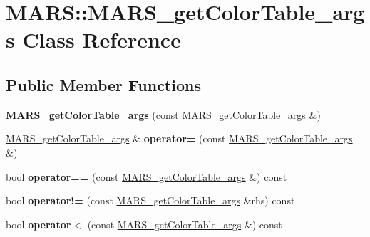 \hypertarget{classMARS_1_1MARS__getColorTable__args}{}\section{M\+A\+RS\+:\+:M\+A\+R\+S\+\_\+get\+Color\+Table\+\_\+args Class Reference}
\label{classMARS_1_1MARS__getColorTable__args}
\subsection*{Public Member Functions}
\begin{DoxyCompactItemize}
\item 
\mbox{\label{classMARS_1_1MARS__getColorTable__args_a8281babd6a3c80608b489c69badb4474}} 
{\bfseries M\+A\+R\+S\+\_\+get\+Color\+Table\+\_\+args} (const \hyperlink{classMARS_1_1MARS__getColorTable__args}{M\+A\+R\+S\+\_\+get\+Color\+Table\+\_\+args} \&)
\item 
\mbox{\label{classMARS_1_1MARS__getColorTable__args_a741536fc92f8da49ac383cdb98035117}} 
\hyperlink{classMARS_1_1MARS__getColorTable__args}{M\+A\+R\+S\+\_\+get\+Color\+Table\+\_\+args} \& {\bfseries operator=} (const \hyperlink{classMARS_1_1MARS__getColorTable__args}{M\+A\+R\+S\+\_\+get\+Color\+Table\+\_\+args} \&)
\item 
\mbox{\label{classMARS_1_1MARS__getColorTable__args_a1a6ebf22a52b65ee6e5e6261795b2153}} 
bool {\bfseries operator==} (const \hyperlink{classMARS_1_1MARS__getColorTable__args}{M\+A\+R\+S\+\_\+get\+Color\+Table\+\_\+args} \&) const
\item 
\mbox{\label{classMARS_1_1MARS__getColorTable__args_a4a0f545f35ea6bca03c384f2692b11d2}} 
bool {\bfseries operator!=} (const \hyperlink{classMARS_1_1MARS__getColorTable__args}{M\+A\+R\+S\+\_\+get\+Color\+Table\+\_\+args} \&rhs) const
\item 
\mbox{\label{classMARS_1_1MARS__getColorTable__args_ada928ce883b979eb7bca7a50bff59eaa}} 
bool {\bfseries operator$<$} (const \hyperlink{classMARS_1_1MARS__getColorTable__args}{M\+A\+R\+S\+\_\+get\+Color\+Table\+\_\+args} \&) const

\end{DoxyCompactItemize}
